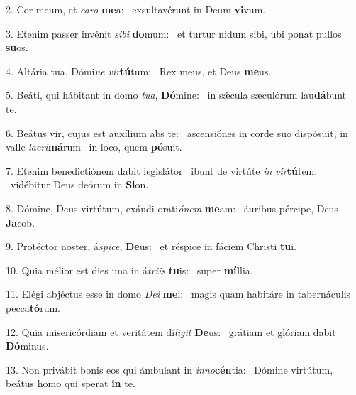 2. Cor meum, et \textit{ca}\textit{ro} \textbf{me}a: \ast\  exsultavérunt in Deum \textbf{vi}vum.\

3. Etenim passer invénit \textit{si}\textit{bi} \textbf{do}mum: \ast\  et turtur nidum sibi, ubi ponat pullos \textbf{su}os.\

4. Altária tua, Dómi\textit{ne} \textit{vir}\textbf{tú}tum: \ast\  Rex meus, et Deus \textbf{me}us.\

5. Beáti, qui hábitant in domo \textit{tu}\textit{a}, \textbf{Dó}mine: \ast\  in sǽcula sæculórum lau\textbf{dá}bunt te.\

6. Beátus vir, cujus est auxílium abs te: \dag\  ascensiónes in corde suo dispósuit, in valle \textit{la}\textit{cri}\textbf{má}rum \ast\  in loco, quem \textbf{pó}suit.\

7. Etenim benedictiónem dabit legislátor \dag\  ibunt de virtúte \textit{in} \textit{vir}\textbf{tú}tem: \ast\  vidébitur Deus deórum in \textbf{Si}on.\

8. Dómine, Deus virtútum, exáudi orati\textit{ó}\textit{nem} \textbf{me}am: \ast\  áuribus pércipe, Deus \textbf{Ja}cob.\

9. Protéctor noster, á\textit{spi}\textit{ce}, \textbf{De}us: \ast\  et réspice in fáciem Christi \textbf{tu}i.\

10. Quia mélior est dies una in á\textit{tri}\textit{is} \textbf{tu}is: \ast\  super \textbf{míl}lia.\

11. Elégi abjéctus esse in domo \textit{De}\textit{i} \textbf{me}i: \ast\  magis quam habitáre in tabernáculis pecca\textbf{tó}rum.\

12. Quia misericórdiam et veritátem dí\textit{li}\textit{git} \textbf{De}us: \ast\  grátiam et glóriam dabit \textbf{Dó}minus.\

13. Non privábit bonis eos qui ámbulant in \textit{in}\textit{no}\textbf{cén}tia: \ast\  Dómine virtútum, beátus homo qui sperat \textbf{in} te.\

